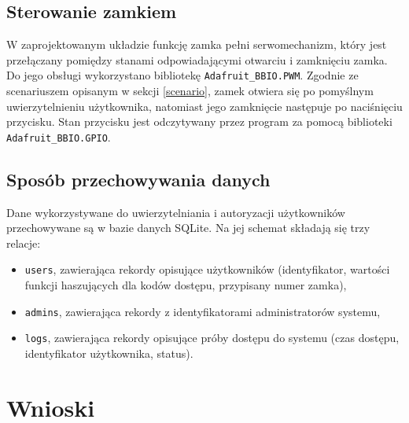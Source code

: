 \documentclass[polish,polish,a4paper]{article}
\begin{document}
	\subsection{Sterowanie zamkiem}
	W zaprojektowanym układzie funkcję zamka pełni serwomechanizm, który jest przełączany pomiędzy stanami odpowiadającymi otwarciu i zamknięciu zamka. Do jego obsługi wykorzystano bibliotekę \linebreak\verb|Adafruit_BBIO.PWM|. Zgodnie ze scenariuszem opisanym w sekcji \ref{scenario}, zamek otwiera się po pomyślnym uwierzytelnieniu użytkownika, natomiast jego zamknięcie następuje po naciśnięciu przycisku. Stan przycisku jest odczytywany przez program za pomocą biblioteki \verb|Adafruit_BBIO.GPIO|.
	
	\subsection{Sposób przechowywania danych}
	Dane wykorzystywane do uwierzytelniania i autoryzacji użytkowników przechowywane są w bazie danych SQLite. Na jej schemat składają się trzy relacje:
	\begin{itemize}
		\item \verb|users|, zawierająca rekordy opisujące użytkowników (identyfikator, wartości funkcji haszujących dla kodów dostępu, przypisany numer zamka),
		\item \verb|admins|, zawierająca rekordy z identyfikatorami administratorów systemu,
		\item \verb|logs|, zawierająca rekordy opisujące próby dostępu do systemu (czas dostępu, identyfikator użytkownika, status).
	\end{itemize}
	
	\section{Wnioski}
	
\end{document}
